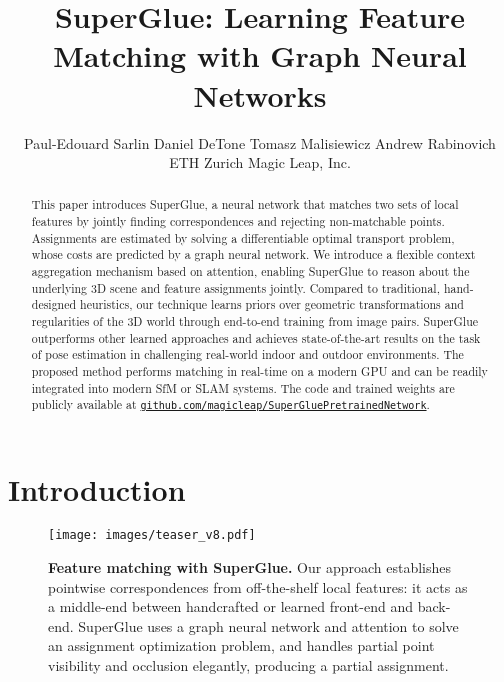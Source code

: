 \documentclass[10pt,twocolumn,letterpaper]{article}
\newif\ifsupponly
\renewcommand{\*}[1]{\mathbf{#1}}
\newcommand{\0}{\phantom{0}}
\begin{document}
\title{SuperGlue: Learning Feature Matching with Graph Neural Networks}

\author{Paul-Edouard Sarlin\footnotemark
\hspace{.1in} Daniel DeTone 
\hspace{.05in} Tomasz Malisiewicz 
\hspace{.05in} Andrew Rabinovich \\
 ETH Zurich
\hspace{.2in}  Magic Leap, Inc.
}

\ifsupponly\else
\maketitle
\ifproceedings\ifcvprfinal\thispagestyle{empty}\fi\fi

\begin{abstract}
This paper introduces SuperGlue, a neural network that matches two sets of local features by jointly finding correspondences and rejecting non-matchable points. Assignments are estimated by solving a differentiable optimal transport problem, whose costs are predicted by a graph neural network. We introduce a flexible context aggregation mechanism based on attention, enabling SuperGlue to reason about the underlying 3D scene and feature assignments jointly. Compared to traditional, hand-designed heuristics, our technique learns priors over geometric transformations and regularities of the 3D world through end-to-end training from image pairs.
SuperGlue outperforms other learned approaches and achieves state-of-the-art results on the task of pose estimation in challenging real-world indoor and outdoor environments. The proposed method performs matching in real-time on a modern GPU and can be readily integrated into modern SfM or SLAM systems. The code and trained weights are publicly available at \footnotesize{\href{https://github.com/magicleap/SuperGluePretrainedNetwork}{\texttt{github.com/magicleap/SuperGluePretrainedNetwork}}}.
\end{abstract}

\vspace{-3mm}
\section{Introduction}

\begin{figure}[t]
   \centering
   \texttt{[image: images/teaser\_v8.pdf]}\caption{\textbf{Feature matching with SuperGlue.}
Our approach establishes pointwise correspondences from off-the-shelf local features: it acts as a middle-end between handcrafted or learned front-end and back-end. SuperGlue uses a graph neural network and attention to solve an assignment optimization problem, and handles partial point visibility and occlusion elegantly, producing a partial assignment.}
    \label{fig:teaser}\end{figure}
\end{document}
